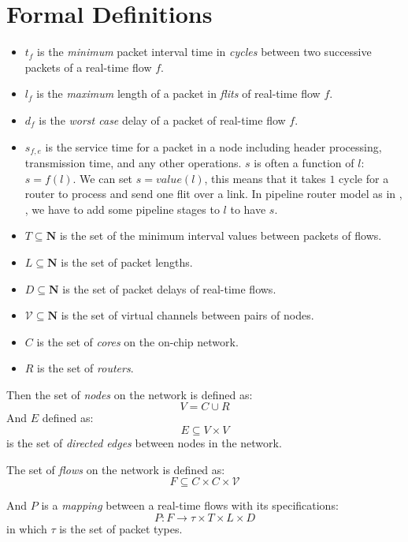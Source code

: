 \documentclass[conference, twocolumn]{IEEEtran}
\theoremstyle{definition}
\begin{document}
\section{Formal Definitions}
\begin{itemize}
\item $t_f$ is the {\em minimum} packet interval time in {\em cycles} between
two successive packets of a real-time flow $f$.
\item $l_f$ is the {\em maximum} length of a packet in {\em flits} of real-time
flow $f$.
\item $d_f$ is the {\em worst case} delay of a packet of real-time flow $f$.
\item $s_{f,e}$ is the service time for a packet in a node including header 
processing, transmission time, and any other operations. $s$ is often a 
function of $l$: $s=f(l)$. We can set $s=value(l)$, this means that it takes $1$
cycle for a router to process and send one flit over a link. In pipeline router
model as in \cite{PehDelayModel}, \cite{PehSpecPipeR}, we have to add some
pipeline stages to $l$ to have $s$.
\item $T \subseteq \mathbf{N}$ is the set of the minimum interval values between
packets of flows.
\item $L \subseteq \mathbf{N}$ is the set of packet lengths.
\item $D \subseteq \mathbf{N}$ is the set of packet delays of real-time flows.
\item $\mathcal{V} \subseteq \mathbf{N}$ is the set of virtual channels between pairs of nodes.
\item $C$ is the set of {\em cores} on the on-chip network.
\item $R$ is the set of {\em routers}.
\end{itemize}

Then the set of {\em nodes} on the network is defined as:
\begin{equation}\label{reio}
V = C \cup R
\end{equation}
And $E$ defined as:
\begin{equation}
E \subseteq V \times V 
\end{equation}
is the set of {\em directed edges} between nodes in the network.

The set of {\em flows} on the network is defined as:
\begin{equation}
F \subseteq C \times C \times \mathcal{V} 
\end{equation}

And $P$ is a {\em mapping } between a real-time flows with its specifications:
\begin{equation}
P:F \rightarrow \tau \times T \times L \times D
\end{equation}
in which $\tau$ is the set of packet types.
\end{document}
